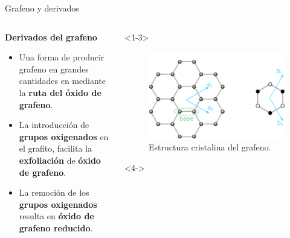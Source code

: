 \documentclass[aspectratio=169]{beamer}
\begin{document}
	\begin{frame}{Grafeno y derivados}
		\begin{columns}
			\begin{column}{0.6\textwidth}
				\only<1->\textbf{Derivados del grafeno}
				\begin{itemize}[<+(1)->]
					\item Una forma de producir grafeno en grandes cantidades en mediante la \textbf{ruta del óxido de grafeno}.
					\item La introducción de \textbf{grupos oxigenados} en el grafito, facilita la \textbf{exfoliación} de \textbf{óxido de grafeno}.
					\item La remoción de los \textbf{grupos oxigenados} resulta en \textbf{óxido de grafeno reducido}.
				\end{itemize}
			\end{column}
			\begin{column}{0.4\textwidth}
				\begin{onlyenv}<1-3>
					\begin{figure}
						\includegraphics[width=\textwidth]{graphene_lattice.pdf}
						\caption{Estructura cristalina del grafeno.}
					\end{figure}
				\end{onlyenv}
				\begin{onlyenv}<4->
					\begin{figure}

\end{figure}
\end{onlyenv}
\end{column}
\end{columns}
\end{frame}
\end{document}
